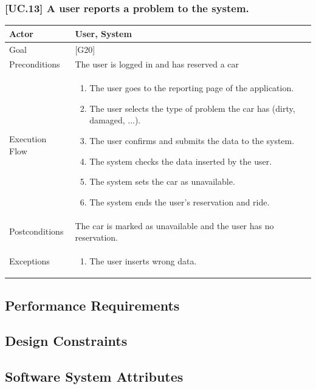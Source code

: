 \documentclass[english]{article}
\begin{document}
  \subsubsection{[UC.13] A user reports a problem to the system.}
  \begin{tabularx}{\textwidth}{  l  X  }
  	\hline
  	Actor & User, System\\
  	\hline
  	Goal & [G20]\\
  	\hline
  	Preconditions & The user is logged in and has reserved a car\\
  	\hline
  	Execution Flow & \begin{enumerate}
  		\item{The user goes to the reporting page of the application.}
  		\item{The user selects the type of problem the car has (dirty, damaged, ...).}
  		\item{The user confirms and submits the data to the system.}
  		\item{The system checks the data inserted by the user.}
  		\item{The system sets the car as unavailable.}
  		\item{The system ends the user's reservation and ride.}
  	\end{enumerate}\\
  	\hline
  	Postconditions & The car is marked as unavailable and the user has no reservation.\\
  	\hline
  	Exceptions & \begin{enumerate}
  		\item{The user inserts wrong data.}
  	\end{enumerate}\\
  	\hline
  \end{tabularx}


\subsection{Performance Requirements}

\subsection{Design Constraints}

\subsection{Software System Attributes}
\end{document}

